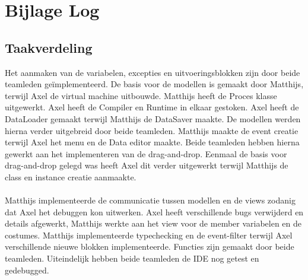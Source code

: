 \documentclass[]{article}
\begin{document}
\section{Bijlage Log}
\subsection{Taakverdeling}
Het aanmaken van de variabelen, excepties en uitvoeringsblokken zijn door beide teamleden ge\"implementeerd. De basis voor de modellen is gemaakt door Matthijs, terwijl Axel de virtual machine uitbouwde. Matthijs heeft de Proces klasse uitgewerkt. Axel heeft de Compiler en Runtime in elkaar gestoken. Axel heeft de DataLoader gemaakt terwijl Matthijs de DataSaver maakte. De modellen werden hierna verder uitgebreid door beide teamleden. Matthijs maakte de event creatie terwijl Axel het menu en de Data editor maakte. Beide teamleden hebben hierna gewerkt aan het implementeren van de drag-and-drop. Eenmaal de basis voor drag-and-drop gelegd was heeft Axel dit verder uitgewerkt terwijl Matthijs de class en instance creatie aanmaakte. \\\\
Matthijs implementeerde de communicatie tussen modellen en de views zodanig dat Axel het debuggen kon uitwerken. Axel heeft verschillende bugs verwijderd en details afgewerkt, Matthijs werkte aan het view voor de member variabelen en de costumes. Matthijs implementeerde typechecking en de event-filter terwijl Axel verschillende nieuwe blokken implementeerde. Functies zijn gemaakt door beide teamleden. Uiteindelijk hebben beide teamleden de IDE nog getest en gedebugged.
\end{document}
